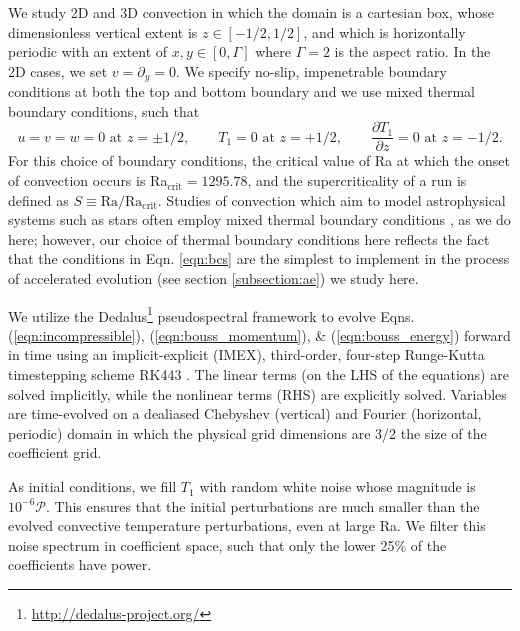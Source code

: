 \documentclass[aps, pre, onecolumn, nofootinbib, notitlepage, groupedaddress, amsfonts, amssymb, amsmath, longbibliography]{revtex4-1}
\begin{document}
We study 2D and 3D convection in which the domain is a cartesian box, 
whose dimensionless vertical extent is $z \in [-1/2, 1/2]$, 
and which is horizontally periodic with an extent of $x, y \in [0, \Gamma]$ where $\Gamma = 2$ is the aspect
ratio. 
In the 2D cases, we set $v = \partial_y = 0$.
We specify no-slip, impenetrable boundary conditions at both the top and
bottom boundary and we use mixed thermal boundary conditions, such that
\begin{equation}
u = v = w = 0 \, \, \text{at}\,\,z = \pm 1/2, \qquad T_1 = 0 \,\,\text{at}\,\, z=+1/2, \qquad
\frac{\partial T_1}{\partial z} = 0\,\,\text{at}\,\,z=-1/2.
\label{eqn:bcs}
\end{equation}
For this choice of boundary conditions, the critical value of Ra at which
the onset of convection occurs is Ra$_{\text{crit}} = 1295.78$, and the
supercriticality of a run is defined as $S \equiv \text{Ra}/\text{Ra}_{\text{crit}}$.
Studies of convection which aim to model
astrophysical systems such as stars often employ mixed thermal
boundary conditions \cite{hurlburt&all1984, cattaneo&all1991, korre&all2017},
as we do here; however, our choice of thermal boundary conditions here
reflects the fact that the conditions in Eqn. \ref{eqn:bcs} are the simplest
to implement in the process of accelerated evolution (see section \ref{subsection:ae})
we study here.

We utilize the 
Dedalus\footnote{\url{http://dedalus-project.org/}} 
pseudospectral framework \cite{burns&all2016} to evolve  
Eqns. (\ref{eqn:incompressible}), (\ref{eqn:bouss_momentum}), \& (\ref{eqn:bouss_energy}) 
forward in time
using an implicit-explicit (IMEX), third-order, four-step 
Runge-Kutta timestepping scheme RK443 \cite{ascher&all1997}.  
The linear terms (on the LHS of the equations) are solved implicitly,
while the nonlinear terms (RHS) are explicitly solved.
Variables are time-evolved on a dealiased Chebyshev (vertical)
and Fourier (horizontal, periodic) domain in which the
physical grid dimensions are 3/2 the size of the coefficient grid.  

As initial conditions, we fill $T_1$ with
random white noise whose magnitude is $10^{-6}\mathcal{P}$.
This ensures that the initial perturbations are much smaller than the
evolved convective temperature perturbations, even at large Ra.
We filter this noise spectrum in coefficient space, 
such that only the lower 25\% of the coefficients
have power.


\end{document}
